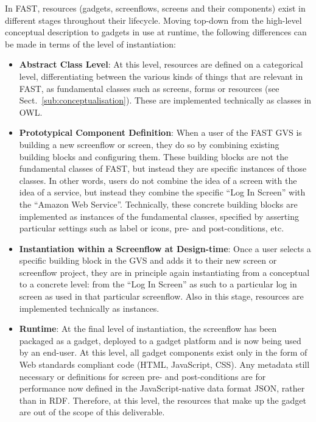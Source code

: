\documentclass[twoside]{fast_latex}
\begin{document}
In FAST, resources (gadgets, screenflows, screens and their components) exist in different stages throughout their lifecycle. Moving top-down from the high-level conceptual description to gadgets in use at runtime, the following differences can be made in terms of the level of instantiation:

\begin{itemize}
	\item \textbf{Abstract Class Level}: At this level, resources are defined on a categorical level, differentiating between the various kinds of things that are relevant in FAST, as fundamental classes such as screens, forms or resources (see Sect.~\ref{sub:conceptualisation}). These are implemented technically as classes in OWL.
	\item \textbf{Prototypical Component Definition}: When a user of the FAST GVS is building a new screenflow or screen, they do so by combining existing building blocks and configuring them. These building blocks are not the fundamental classes of FAST, but instead they are specific instances of those classes. In other words, users do not combine the idea of a screen with the idea of a service, but instead they combine the specific ``Log In Screen'' with the ``Amazon Web Service''. Technically, these concrete building blocks are implemented as instances of the fundamental classes, specified by asserting particular settings such as label or icons, pre- and post-conditions, etc.
	\item \textbf{Instantiation within a Screenflow at Design-time}: Once a user selects a specific building block in the GVS and adds it to their new screen or screenflow project, they are in principle again instantiating from a conceptual to a concrete level: from the ``Log In Screen'' as such to a particular log in screen as used in that particular screenflow. Also in this stage, resources are implemented technically as instances.
	\item \textbf{Runtime}: At the final level of instantiation, the screenflow has been packaged as a gadget, deployed to a gadget platform and is now being used by an end-user. At this level, all gadget components exist only in the form of Web standards compliant code (HTML, JavaScript, CSS). Any metadata still necessary or definitions for screen pre- and post-conditions are for performance now defined in the JavaScript-native data format JSON, rather than in RDF. Therefore, at this level, the resources that make up the gadget are out of the scope of this deliverable.
\end{itemize}
\end{document}
